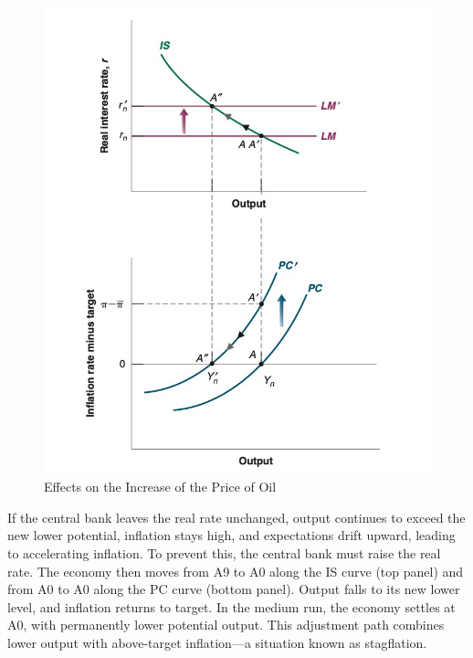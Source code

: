 \documentclass{extarticle}
\begin{document}
\begin{figure}[H]
    \centering 
    \includegraphics[width=0.45\linewidth]{stagflation.png}
    \caption{Effects on the Increase of the Price of Oil} 
    \label{fig:oil} 
\end{figure}


If the central bank leaves the real rate unchanged, output continues to exceed the new lower potential, inflation stays high, and expectations drift upward, leading to accelerating inflation. To prevent this, the central bank must raise the real rate. 
The economy then moves from A9 to A0 along the IS curve (top panel) and from A0 to A0 along the PC curve (bottom panel). Output falls to its new lower level, and inflation returns to target. In the medium run, the economy settles at A0, with permanently lower potential output. 
This adjustment path combines lower output with above-target inflation—a situation known as stagflation.
\end{document}
